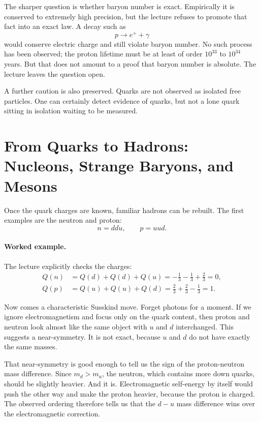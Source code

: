 The sharper question is whether baryon number is exact. Empirically it is conserved to extremely high precision, but the lecture refuses to promote that fact into an exact law. A decay such as
\begin{equation}
p\to e^+ + \gamma
\end{equation}
would conserve electric charge and still violate baryon number. No such process has been observed; the proton lifetime must be at least of order \(10^{33}\) to \(10^{34}\) years. But that does not amount to a proof that baryon number is absolute. The lecture leaves the question open.

A further caution is also preserved. Quarks are not observed as isolated free particles. One can certainly detect evidence of quarks, but not a lone quark sitting in isolation waiting to be measured.

\section{From Quarks to Hadrons: Nucleons, Strange Baryons, and Mesons}

Once the quark charges are known, familiar hadrons can be rebuilt. The first examples are the neutron and proton:
\begin{equation}
n=ddu,
\qquad
p=uud.
\end{equation}

\paragraph{Worked example.} The lecture explicitly checks the charges:
\begin{align}
Q(n) &= Q(d)+Q(d)+Q(u)
= -\frac13-\frac13+\frac23
=0,\\
Q(p) &= Q(u)+Q(u)+Q(d)
= \frac23+\frac23-\frac13
=1.
\end{align}

Now comes a characteristic Susskind move. Forget photons for a moment. If we ignore electromagnetism and focus only on the quark content, then proton and neutron look almost like the same object with \(u\) and \(d\) interchanged. This suggests a near-symmetry. It is not exact, because \(u\) and \(d\) do not have exactly the same masses.

That near-symmetry is good enough to tell us the sign of the proton-neutron mass difference. Since \(m_d>m_u\), the neutron, which contains more down quarks, should be slightly heavier. And it is. Electromagnetic self-energy by itself would push the other way and make the proton heavier, because the proton is charged. The observed ordering therefore tells us that the \(d-u\) mass difference wins over the electromagnetic correction.

